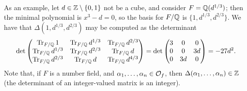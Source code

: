 As an example, let $d \in \mathbb Z \setminus \{0, 1\}$ not be a cube, and consider $F = \mathbb Q(d^{1/3})$; then the minimal polynomial is $x^3 - d = 0$, so the basis for $F/\mathbb Q$ is $\{1, d^{1/3}, d^{2/3}\}$. We have that $\Delta(1, d^{1/3}, d^{2/3})$ may be computed as the determinant
\[ \det \begin{pmatrix}
    \operatorname{Tr}_{F/\mathbb Q} 1 & \operatorname{Tr}_{F/\mathbb Q} d^{1/3} & \operatorname{Tr}_{F/\mathbb Q} d^{2/3} \\
    \operatorname{Tr}_{F/\mathbb Q} d^{1/3} & \operatorname{Tr}_{F/\mathbb Q} d^{2/3} & \operatorname{Tr}_{F/\mathbb Q} d \\
    \operatorname{Tr}_{F/\mathbb Q} d^{2/3} & \operatorname{Tr}_{F/\mathbb Q} d & \operatorname{Tr}_{F/\mathbb Q} d^{4/3}
\end{pmatrix} = \det \begin{pmatrix} 3 & 0 & 0 \\ 0 & 0 & 3d \\ 0 & 3d & 0 \end{pmatrix} = -27d^2. \]
Note that, if $F$ is a number field, and $\alpha_1, \dots, \alpha_n \in \mathcal O_f$, then $\Delta(\alpha_1, \dots, \alpha_n) \in \mathbb Z$ (the determinant of an integer-valued matrix is an integer).

